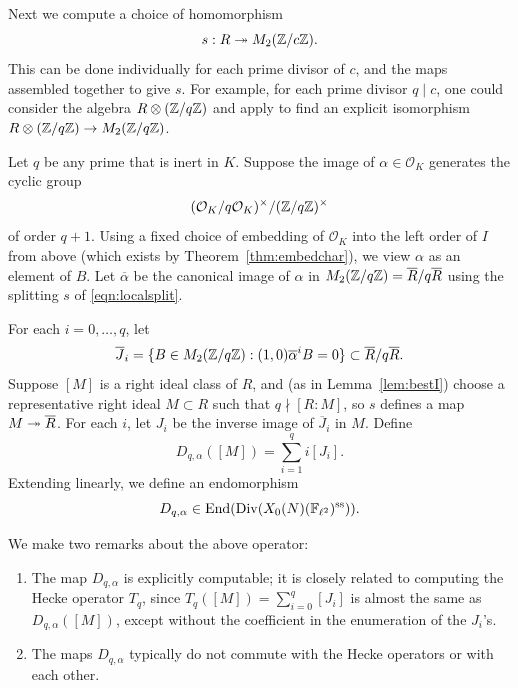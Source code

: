 \documentclass{article} \usepackage[active]{srcltx}
\renewcommand{\O}{\mathcal{O}}
\DeclareMathOperator{\supersingular}{ss}
\renewcommand{\ss}{\supersingular}
\begin{document}
Next we compute a choice of  homomorphism
\begin{equation}\label{eqn:localsplit}
 s:R \twoheadrightarrow M_2(\mathbb{Z}/c\mathbb{Z}).
\end{equation}
This can be done individually for each prime divisor of $c$, and the
maps assembled together to give $s$.  For example, for each prime divisor
$q\mid c$, one could consider the algebra $R\otimes (\mathbb{Z}/q\mathbb{Z})$ and
apply \cite[\S4]{voight:matrix} to find an explicit isomorphism
$R\otimes (\mathbb{Z}/q\mathbb{Z}) \to M_2(\mathbb{Z}/q\mathbb{Z})$.



Let $q$ be any prime that is inert in $K$.
Suppose the image of $\alpha \in \O_K$ generates the cyclic group 
$$
  (\O_K/q\O_K)^{\times}/(\Z/q\Z)^{\times}
$$
of order $q+1$.  Using a fixed choice of embedding of $\O_K$ into the left order of
$I$ from above (which exists by Theorem~\ref{thm:embedchar}), 
we view $\alpha$ as an element of $B$.  Let
$\overline{\alpha}$ be the canonical image of $\alpha$ in $M_2(\mathbb{Z}/q\mathbb{Z})
= \overline{R}/q\overline{R}$ using the splitting $s$ of \eqref{eqn:localsplit}.

For each $i=0,\ldots, q$, let 
$$
 \overline{J}_i = \{B \in M_2(\mathbb{Z}/q\mathbb{Z}) : (1,0)\overline{\alpha}^i B = 0\}
\subset \overline{R}/q \overline{R}.
$$
Suppose $[M]$ is a right ideal class of $R$, and (as in
Lemma~\ref{lem:bestI}) choose a representative right ideal $M\subset
R$ such that $q\nmid [R:M]$, so $s$ defines a map $M\twoheadrightarrow \overline{R}$.  For
each $i$, let $J_i$ be the inverse image of $\overline{J}_i$ in $M$.
Define
$$
  D_{q,\alpha}([M]) = \sum_{i=1}^{q} i [J_i].
$$
Extending linearly, we define an endomorphism
$$ 
  D_{q,\alpha} \in \End(\Div(X_0(N)(\F_{\ell^2})^{\ss})).
$$

\begin{remark} We make two remarks about the above 
operator:
\begin{enumerate}
\item The map $D_{q,\alpha}$ is explicitly computable; it is 
closely related to  computing the Hecke operator $T_q$, 
since $T_q([M]) = \sum_{i=0}^{q} [J_i]$ is almost the same
as $D_{q,\alpha}([M])$, 
except without the coefficient in the enumeration of the $J_i$'s.
\item The maps $D_{q,\alpha}$ typically do not commute with the Hecke
  operators or with each other.
\end{enumerate}
\end{remark}
\end{document}
